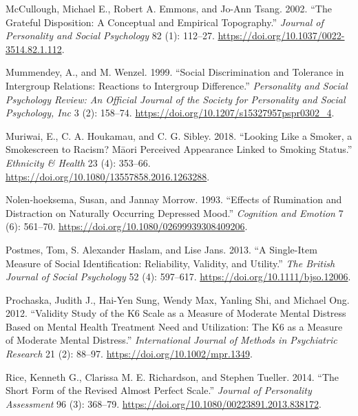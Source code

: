 \documentclass[
  singlecolumn]{report}
\newlength{\cslhangindent}
\newlength{\cslentryspacingunit} %
\newenvironment{CSLReferences}[2] %
 {%
  \setlength{\parindent}{0pt}
  \ifodd #1
  \let\oldpar\par
  \def\par{\hangindent=\cslhangindent\oldpar}
  \fi
  \setlength{\parskip}{#2\cslentryspacingunit}
 }%
 {}
\begin{document}
\begin{CSLReferences}{1}{0}
\leavevmode{}%
McCullough, Michael E., Robert A. Emmons, and Jo-Ann Tsang. 2002. {``The
Grateful Disposition: A Conceptual and Empirical Topography.''}
\emph{Journal of Personality and Social Psychology} 82 (1): 112--27.
\url{https://doi.org/10.1037/0022-3514.82.1.112}.

\leavevmode{}%
Mummendey, A., and M. Wenzel. 1999. {``Social Discrimination and
Tolerance in Intergroup Relations: Reactions to Intergroup
Difference.''} \emph{Personality and Social Psychology Review: An
Official Journal of the Society for Personality and Social Psychology,
Inc} 3 (2): 158--74. \url{https://doi.org/10.1207/s15327957pspr0302_4}.

\leavevmode{}%
Muriwai, E., C. A. Houkamau, and C. G. Sibley. 2018. {``Looking Like a
Smoker, a Smokescreen to Racism? Māori Perceived Appearance Linked to
Smoking Status.''} \emph{Ethnicity \& Health} 23 (4): 353--66.
\url{https://doi.org/10.1080/13557858.2016.1263288}.

\leavevmode{}%
Nolen-hoeksema, Susan, and Jannay Morrow. 1993. {``Effects of Rumination
and Distraction on Naturally Occurring Depressed Mood.''}
\emph{Cognition and Emotion} 7 (6): 561--70.
\url{https://doi.org/10.1080/02699939308409206}.

\leavevmode{}%
Postmes, Tom, S. Alexander Haslam, and Lise Jans. 2013. {``A Single-Item
Measure of Social Identification: Reliability, Validity, and Utility.''}
\emph{The British Journal of Social Psychology} 52 (4): 597--617.
\url{https://doi.org/10.1111/bjso.12006}.

\leavevmode{}%
Prochaska, Judith J., Hai-Yen Sung, Wendy Max, Yanling Shi, and Michael
Ong. 2012. {``Validity Study of the K6 Scale as a Measure of Moderate
Mental Distress Based on Mental Health Treatment Need and Utilization:
The K6 as a Measure of Moderate Mental Distress.''} \emph{International
Journal of Methods in Psychiatric Research} 21 (2): 88--97.
\url{https://doi.org/10.1002/mpr.1349}.

\leavevmode{}%
Rice, Kenneth G., Clarissa M. E. Richardson, and Stephen Tueller. 2014.
{``The Short Form of the Revised Almost Perfect Scale.''} \emph{Journal
of Personality Assessment} 96 (3): 368--79.
\url{https://doi.org/10.1080/00223891.2013.838172}.


\end{CSLReferences}
\end{document}
